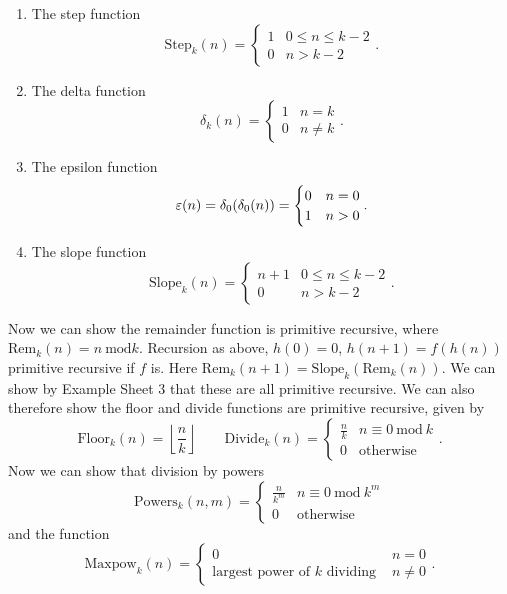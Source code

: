 \documentclass[tikx, border = 10pt]{article}
\begin{document}
\begin{enumerate}
	\item The step function 
		\[
			\mathrm{Step}_k(n) = \begin{cases}
				1 & 0 \le n \le k -2 \\
				0 & n > k -2
			\end{cases}.
		\]
	\item The delta function
		\[
		  \delta_k(n) = \begin{cases}
			  1 & n =k \\
			  0 & n \ne k
		  \end{cases}.
		\]
	\item The epsilon function
		\[
		  \varepsilon(n) = \delta_0(\delta_0(n)) = \begin{cases}
		     0 & n =0 \\
		     1 & n > 0
		  \end{cases}.
		\]
	\item The slope function
		\[
			\mathrm{Slope}_k(n) = \begin{cases}
			   n +1 & 0 \le n \le k -2 \\
			   0 & n > k -2
			\end{cases}.
		\]
\end{enumerate}
Now we can show the remainder function is primitive recursive, where $ \mathrm{Rem}_k(n) = n \ \mathrm{mod} k $. Recursion as above, $ h(0) = 0 $, $ h(n+1) = f(h(n)) $ primitive recursive if $ f $ is. Here $ \mathrm{Rem}_k(n+1) = \mathrm{Slope}_k(\mathrm{Rem}_k(n)) $. We can show by Example Sheet 3 that these are all primitive recursive. We can also therefore show the floor and divide functions are primitive recursive, given by
\[
	\mathrm{Floor}_k(n) = \left\lfloor \frac nk\right\rfloor \qquad \mathrm{Divide}_k(n) = \begin{cases}
		\frac nk & n \equiv 0 \ \mathrm{mod} \ k \\
		0 & \text{otherwise}
	\end{cases}.
\]
Now we can show that division by powers
\[
	\mathrm{Powers}_k(n,m) = \begin{cases}
		\frac n{k^m} & n \equiv 0 \ \mathrm{mod}\ k^m \\
		0 & \text{otherwise}
	\end{cases}
\]
and the function
\[
	\mathrm{Maxpow}_k(n) = \begin{cases}
	   0 & n = 0 \\
	   \text{largest power of } k \text{ dividing } & n \ne 0
	\end{cases}.
\]
\end{document}
